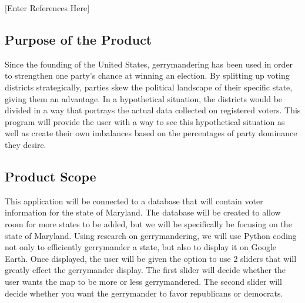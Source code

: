 \documentclass{article}
\begin{document}
\begin{addmargin}[4em]{0em}

[Enter References Here]

\end{addmargin}

\vspace{2.5mm}


\subsection{Purpose of the Product}

\vspace{2.5mm}

\begin{addmargin}[4em]{0em}

Since the founding of the United States, gerrymandering has been used in order to strengthen one party's chance at winning an election. By splitting up voting districts strategically, parties skew the political landscape of their specific state, giving them an advantage. In a hypothetical situation, the districts would be divided in a way that portrays the actual data collected on registered voters. This program will provide the user with a way to see this hypothetical situation as well as create their own imbalances based on the percentages of party dominance they desire.

\vspace{2.5mm}

\end{addmargin}


\subsection{Product Scope}

\vspace{2.5mm}

\begin{addmargin}[4em]{0em}

This application will be connected to a database that will contain voter information for the state of Maryland. The database will be created to allow room for more states to be added, but we will be specifically be focusing on the state of Maryland. Using research on gerrymandering, we will use Python coding not only to efficiently gerrymander a state, but also to display it on Google Earth. Once displayed, the user will be given the option to use 2 sliders that will greatly effect the gerrymander display. The first slider will decide whether the user wants the map to be more or less gerrymandered. The second slider will decide whether you want the gerrymander to favor republicans or democrats. 

\end{addmargin}
\end{document}

